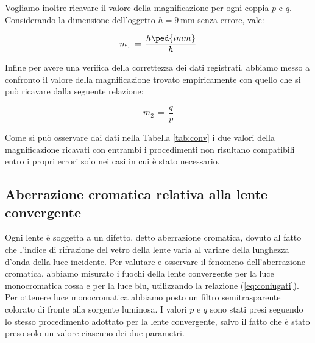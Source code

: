 Vogliamo inoltre ricavare il valore della magnificazione per ogni coppia $p$ e $q$.
Considerando la dimensione dell'oggetto $h = \SI{9}{\milli\metre}$ senza errore, vale:

\begin{equation}
	m_{1} \,=\, \frac{h \ped{imm}}{h}
\end{equation}

Infine per avere una verifica della correttezza dei dati registrati, abbiamo messo a confronto il valore della magnificazione trovato empiricamente con quello che si può ricavare dalla seguente relazione:

\begin{equation}
	m_{2} \,=\, \frac{q}{p}
\end{equation}



Come si può osservare dai dati nella Tabella \ref{tab:conv} i due valori della magnificazione ricavati con entrambi i procedimenti non risultano compatibili entro i propri errori solo nei casi in cui è stato necessario.

\subsection{Aberrazione cromatica relativa alla lente convergente}

Ogni lente è soggetta a un difetto, detto aberrazione cromatica, dovuto al fatto che l'indice di rifrazione del vetro della lente varia al variare della lunghezza d'onda della luce incidente.
Per valutare e osservare il fenomeno dell'aberrazione cromatica, abbiamo misurato i fuochi della lente convergente per la luce monocromatica rossa e per la luce blu, utilizzando la relazione (\ref{eq:coniugati}).
Per ottenere luce monocromatica abbiamo posto un filtro semitrasparente colorato di fronte alla sorgente luminosa. I valori $p$ e $q$ sono stati presi seguendo lo stesso procedimento adottato per la lente convergente, salvo il fatto che è stato preso solo un valore ciascuno dei due parametri.

